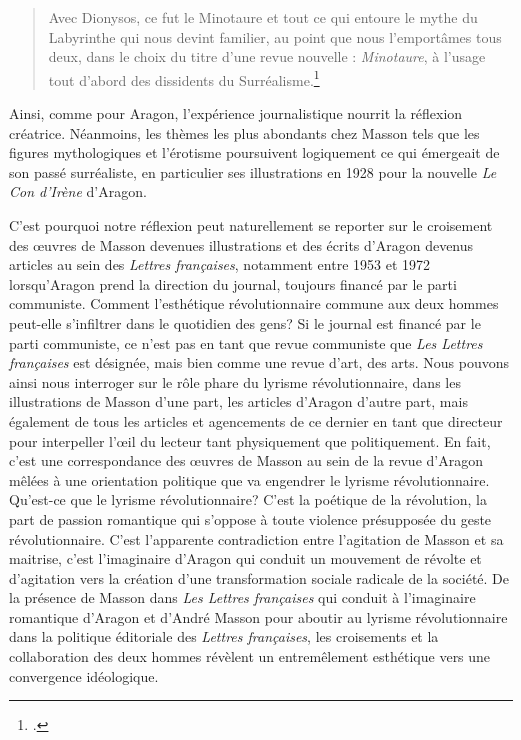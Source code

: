  \begin{quote}
 Avec Dionysos, ce fut le Minotaure et tout ce qui entoure le mythe du Labyrinthe qui nous devint familier, au point que nous l'emportâmes tous deux, dans le choix du titre d'une revue nouvelle : \emph{Minotaure}, à l'usage tout d'abord des dissidents du Surréalisme.\footcite[p130]{memoiremonde}\end{quote}
 
 Ainsi, comme pour Aragon, l’expérience journalistique nourrit la réflexion créatrice. Néanmoins, les thèmes les plus abondants chez Masson tels que les figures mythologiques et l'érotisme poursuivent logiquement ce qui émergeait de son passé surréaliste, en particulier ses illustrations en 1928 pour la nouvelle \emph{Le Con d'Irène} d'Aragon. 

C’est pourquoi notre réflexion peut naturellement se reporter sur le croisement des \oe{}uvres de Masson devenues illustrations et des écrits d’Aragon devenus articles au sein des \emph{Lettres françaises}, notamment entre 1953 et 1972 lorsqu’Aragon prend la direction du journal, toujours financé par le parti communiste. Comment l’esthétique révolutionnaire commune aux deux hommes peut-elle s’infiltrer dans le quotidien des gens? Si le journal est financé par le parti communiste, ce n’est pas en tant que revue communiste que \emph{Les Lettres françaises} est désignée, mais bien comme une revue d’art, des arts. Nous pouvons ainsi nous interroger sur le rôle phare du lyrisme révolutionnaire, dans les illustrations de Masson d’une part, les articles d’Aragon d’autre part, mais également de tous les articles et agencements de ce dernier en tant que directeur pour interpeller l’\oe{}il du lecteur tant physiquement que politiquement. En fait, c’est une correspondance des \oe{}uvres de Masson au sein de la revue d’Aragon mêlées à une orientation politique que va engendrer le lyrisme révolutionnaire. Qu’est-ce que le lyrisme révolutionnaire? C’est la poétique de la révolution, la part de passion romantique qui s’oppose à toute violence présupposée du geste révolutionnaire. C’est l’apparente contradiction entre l’agitation de Masson et sa maitrise, c’est l’imaginaire d’Aragon qui conduit un mouvement de révolte et d’agitation vers la création d’une transformation sociale radicale de la société. De la présence de Masson dans \emph{Les Lettres françaises} qui conduit à l’imaginaire romantique d’Aragon et d’André Masson pour aboutir au lyrisme révolutionnaire dans la politique éditoriale des \emph{Lettres françaises}, les croisements et la collaboration des deux hommes révèlent un entremêlement esthétique vers une convergence idéologique. 